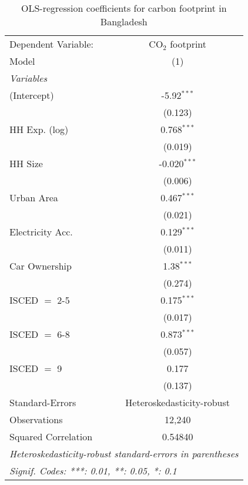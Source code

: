 
\begin{table}[htbp!]
   \centering
   \small
   \begin{adjustbox}{width = 1\textwidth, max height = 0.95\textheight, center}
      \begin{threeparttable}[b]
         \caption{\label{tab:OLS_2_BGD} OLS-regression coefficients for carbon footprint in Bangladesh}
         \begin{tabular}{lc}
            \tabularnewline \midrule \midrule
            Dependent Variable: & CO$_{2}$ footprint\\  
            Model               & (1)\\  
            \midrule
            \emph{Variables}\\
            (Intercept)         & -5.92$^{***}$\\   
                                & (0.123)\\   
            HH Exp. (log)       & 0.768$^{***}$\\   
                                & (0.019)\\   
            HH Size             & -0.020$^{***}$\\   
                                & (0.006)\\   
            Urban Area          & 0.467$^{***}$\\   
                                & (0.021)\\   
            Electricity Acc.    & 0.129$^{***}$\\   
                                & (0.011)\\   
            Car Ownership       & 1.38$^{***}$\\   
                                & (0.274)\\   
            ISCED $=$ 2-5       & 0.175$^{***}$\\   
                                & (0.017)\\   
            ISCED $=$ 6-8       & 0.873$^{***}$\\   
                                & (0.057)\\   
            ISCED $=$ 9         & 0.177\\   
                                & (0.137)\\   
            \midrule 
            Standard-Errors     & Heteroskedasticity-robust \\   
            Observations        & 12,240\\  
            Squared Correlation & 0.54840\\  
            \midrule \midrule
            \multicolumn{2}{l}{\emph{Heteroskedasticity-robust standard-errors in parentheses}}\\
            \multicolumn{2}{l}{\emph{Signif. Codes: ***: 0.01, **: 0.05, *: 0.1}}\\
         \end{tabular}
         

\end{threeparttable}
\end{adjustbox}
\end{table}
